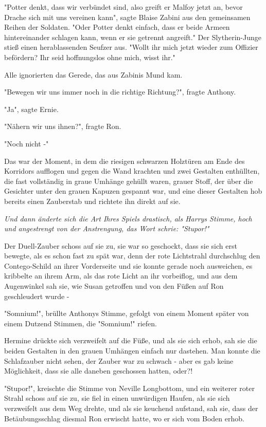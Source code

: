 {"Potter denkt, dass wir verbündet sind, also greift er Malfoy jetzt an, bevor Drache sich mit uns vereinen kann", sagte Blaise Zabini aus den gemeinsamen Reihen der Soldaten. "Oder Potter denkt einfach, dass er beide Armeen hintereinander schlagen kann, wenn er sie getrennt angreift." Der Slytherin-Junge stieß einen herablassenden Seufzer aus. "Wollt ihr mich jetzt wieder zum Offizier befördern? Ihr seid hoffnungslos ohne mich, wisst ihr."

Alle ignorierten das Gerede, das aus Zabinis Mund kam.

"Bewegen wir uns immer noch in die richtige Richtung?", fragte Anthony.

"Ja", sagte Ernie.

"Nähern wir uns ihnen?", fragte Ron.

"Noch nicht -"

Das war der Moment, in dem die riesigen schwarzen Holztüren am Ende des Korridors aufflogen und gegen die Wand krachten und zwei Gestalten enthüllten, die fast vollständig in graue Umhänge gehüllt waren, grauer Stoff, der über die Gesichter unter den grauen Kapuzen gespannt war, und eine dieser Gestalten hob bereits einen Zauberstab und richtete ihn direkt auf sie.

\emph{Und dann änderte sich die Art Ihres Spiels drastisch, als Harrys Stimme, hoch und angestrengt von der Anstrengung, das Wort schrie: "Stupor!"}

Der Duell-Zauber schoss auf sie zu, sie war so geschockt, dass sie sich erst bewegte, als es schon fast zu spät war, denn der rote Lichtstrahl durchschlug den Contego-Schild an ihrer Vorderseite und sie konnte gerade noch ausweichen, es kribbelte an ihrem Arm, als das rote Licht an ihr vorbeiflog, und aus dem Augenwinkel sah sie, wie Susan getroffen und von den Füßen auf Ron geschleudert wurde -

"Somnium!", brüllte Anthonys Stimme, gefolgt von einem Moment später von einem Dutzend Stimmen, die "Somnium!" riefen.

Hermine drückte sich verzweifelt auf die Füße, und als sie sich erhob, sah sie die beiden Gestalten in den grauen Umhängen einfach nur dastehen. Man konnte die Schlafzauber nicht sehen, der Zauber war zu schwach - aber es gab keine Möglichkeit, dass sie alle daneben geschossen hatten, oder?!

"Stupor!", kreischte die Stimme von Neville Longbottom, und ein weiterer roter Strahl schoss auf sie zu, sie fiel in einen unwürdigen Haufen, als sie sich verzweifelt aus dem Weg drehte, und als sie keuchend aufstand, sah sie, dass der Betäubungsschlag diesmal Ron erwischt hatte, wo er sich vom Boden erhob.

}
